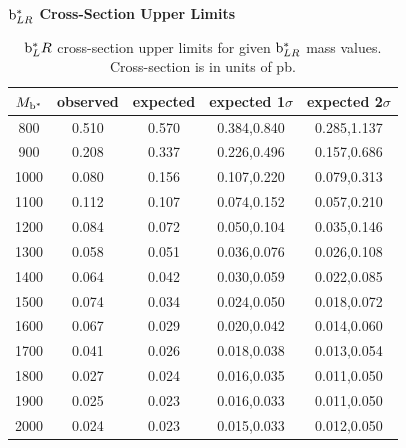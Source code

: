 \begin{table}[htcb]
\begin{center}
\bf{$\mathrm{b}^{*}_{LR}$ Cross-Section Upper Limits}\\
\begin{tabular}{|c||c|c|c|c|}
\hline
\bf{$M_{\mathrm{b}^{*}}$} & \bf{observed}  & \bf{expected} & \bf{expected 1$\sigma$}  & \bf{expected 2$\sigma$} \\
\hline
\hline
800 & 0.510 & 0.570 & 0.384,0.840 & 0.285,1.137\\ 
\hline
900 & 0.208 & 0.337 & 0.226,0.496 & 0.157,0.686\\ 
\hline
1000 & 0.080 & 0.156 & 0.107,0.220 & 0.079,0.313\\ 
\hline
1100 & 0.112 & 0.107 & 0.074,0.152 & 0.057,0.210\\ 
\hline
1200 & 0.084 & 0.072 & 0.050,0.104 & 0.035,0.146\\ 
\hline
1300 & 0.058 & 0.051 & 0.036,0.076 & 0.026,0.108\\ 
\hline
1400 & 0.064 & 0.042 & 0.030,0.059 & 0.022,0.085\\ 
\hline
1500 & 0.074 & 0.034 & 0.024,0.050 & 0.018,0.072\\
\hline
1600 & 0.067 & 0.029 & 0.020,0.042 & 0.014,0.060\\ 
\hline
1700 & 0.041 & 0.026 & 0.018,0.038 & 0.013,0.054\\ 
\hline
1800 & 0.027 & 0.024 & 0.016,0.035 & 0.011,0.050\\ 
\hline
1900 & 0.025 & 0.023 & 0.016,0.033 & 0.011,0.050\\ 
\hline
2000 & 0.024 & 0.023 & 0.015,0.033 & 0.012,0.050\\ 
\hline
\end{tabular}
\end{center}
\caption{$\mathrm{b}^{*}_LR$ cross-section upper limits for given $\mathrm{b}^{*}_{LR}$ mass values.  Cross-section is in units of pb.}
\label{table:bsupperxsecLR}
\end{table}


